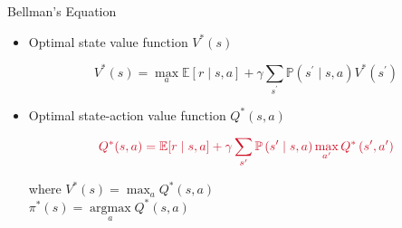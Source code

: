 \documentclass[11pt,table]{beamer}
\begin{document}
\begin{frame}{Bellman's Equation}
\begin{itemize}
    \item Optimal state value function $V^{*}(s)$

$$
V^{*}(s)=\max _{a} \mathbb{E}[r \mid s, a]+\gamma \sum_{s^{\prime}} \mathbb{P}\left(s^{\prime} \mid s, a\right) V^{*}\left(s^{\prime}\right)
$$

\item Optimal state-action value function $Q^{*}(s, a)$

$$
\textcolor{red1}{Q^{*}(s, a)=\mathbb{E}[r\mid s,a]+\gamma \sum_{s^{\prime}} \mathbb{P}\left(s^{\prime}\mid s,a\right) \max _{a^{\prime}} Q^{*}\left(s^{\prime}, a^{\prime}\right)}
$$

where $V^{*}(s)=\max _{a} Q^{*}(s, a)$\\
\quad\quad\quad $
\pi^{*}(s)=\underset{a}{\operatorname{argmax}} Q^{*}(s, a)
$ 
\end{itemize}    
\end{frame}
\end{document}
